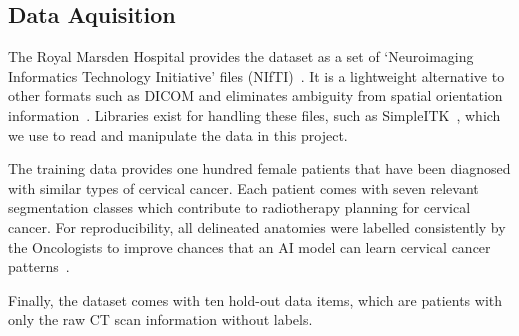 \documentclass[12pt,twoside]{report}
\begin{document}
\subsection{Data Aquisition}

The Royal Marsden Hospital provides the dataset as a set of `Neuroimaging Informatics Technology Initiative' files (NIfTI)~\cite{file-formats}. It is a lightweight alternative to other formats such as DICOM and eliminates ambiguity from spatial orientation information~\cite{dicom-to-nifti-conversion}. Libraries exist for handling these files, such as SimpleITK~\cite{SimpleITK-paper}, which we use to read and manipulate the data in this project. %

The training data provides one hundred female patients that have been diagnosed with similar types of cervical cancer. Each patient comes with seven relevant segmentation classes which contribute to radiotherapy planning for cervical cancer. For reproducibility, all delineated anatomies were labelled consistently by the Oncologists to improve chances that an AI model can learn cervical cancer patterns~\cite{AMLART-data}. 

Finally, the dataset comes with ten hold-out data items, which are patients with only the raw CT scan information without labels.



\end{document}
